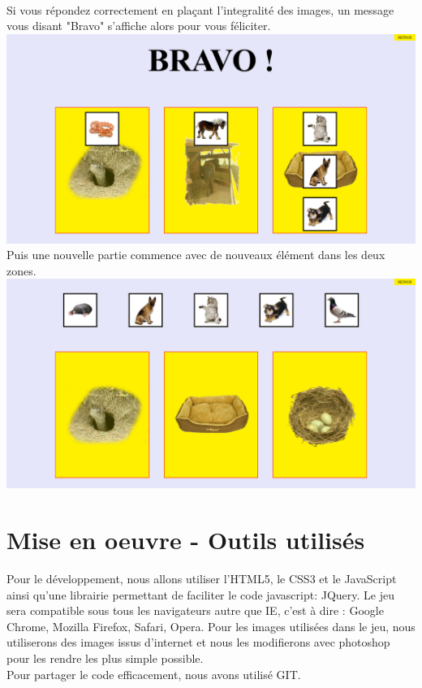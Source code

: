 \documentclass{article}
\begin{document}
\vspace{0.5cm}\\
Si vous r\'epondez correctement en pla\c{c}ant l'integralit\'e des images, un message vous disant "Bravo" s'affiche alors pour vous f\'eliciter.
\vspace{0.5cm}\\
\includegraphics[width=1.0\textwidth]{zone6}
\vspace{0.5cm}\\
Puis une nouvelle partie commence avec de nouveaux \'el\'ement dans les deux zones.
\vspace{0.5cm}\\
\includegraphics[width=1.0\textwidth]{zone7}
\vspace{0.5cm}\\


\section{Mise en oeuvre - Outils utilis\'es}
\hspace*{0.6cm}Pour le d\'eveloppement, nous allons utiliser l'HTML5, le CSS3 et le JavaScript ainsi qu'une librairie permettant de faciliter le code javascript: JQuery. Le jeu sera compatible sous tous les navigateurs autre que IE, c'est \`a dire : Google Chrome, Mozilla Firefox, Safari, Opera.
Pour les images utilis\'ees dans le jeu, nous utiliserons des images issus d'internet et nous les modifierons avec photoshop pour les rendre les plus simple possible.\\
Pour partager le code efficacement, nous avons utilis\'e GIT.
\end{document}

